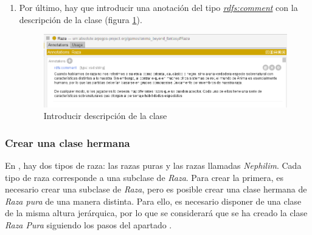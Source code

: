 \begin{enumerate}
    \item Por último, hay que introducir una anotación del tipo \textit{\underline{rdfs:comment}} con la descripción 
    de la clase (figura \ref*{CreateClass_4}).

    \begin{figure}[ht]
        \centering
        \includegraphics[scale=0.6]{Figures/Protege/CreateClass_4.png}
        \caption{Introducir descripción de la clase}
        \label{CreateClass_4}
    \end{figure}

\end{enumerate}

\subsubsection{Crear una clase hermana} \label{CreateSiblingClass}
En \anima, hay dos tipos de raza: las razas puras y las razas llamadas \textit{Nephilim}. Cada tipo de raza 
corresponde a una subclase de \textit{Raza}. Para crear la primera, es necesario crear una subclase de \textit{Raza}, 
pero es posible crear una clase hermana de \textit{Raza pura} de una manera distinta. Para ello, es necesario disponer 
de una clase de la misma altura jerárquica, por lo que se considerará que se ha creado la clase \textit{Raza Pura} siguiendo 
los pasos del apartado .

